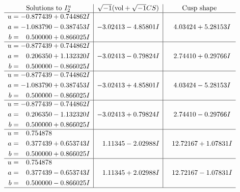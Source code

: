 \documentclass[1p]{elsarticle_modified}
\theoremstyle{definition}
\newcommand{\I}{\sqrt{-1}}
\begin{document}
$$\begin{array}{c|c|c}  
\text{Solutions to }I^u_{2}& \I (\text{vol} + \sqrt{-1}CS) & \text{Cusp shape}\\
 \hline 
\begin{aligned}
u &= -0.877439 + 0.744862 I \\
a &= -1.083790 - 0.387453 I \\
b &= \phantom{-}0.500000 + 0.866025 I\end{aligned}
 & -3.02413 - 4.85801 I & \phantom{-}4.03424 + 5.28153 I \\ \hline\begin{aligned}
u &= -0.877439 + 0.744862 I \\
a &= \phantom{-}0.206350 + 1.132320 I \\
b &= \phantom{-}0.500000 - 0.866025 I\end{aligned}
 & -3.02413 - 0.79824 I & \phantom{-}2.74410 + 0.29766 I \\ \hline\begin{aligned}
u &= -0.877439 - 0.744862 I \\
a &= -1.083790 + 0.387453 I \\
b &= \phantom{-}0.500000 - 0.866025 I\end{aligned}
 & -3.02413 + 4.85801 I & \phantom{-}4.03424 - 5.28153 I \\ \hline\begin{aligned}
u &= -0.877439 - 0.744862 I \\
a &= \phantom{-}0.206350 - 1.132320 I \\
b &= \phantom{-}0.500000 + 0.866025 I\end{aligned}
 & -3.02413 + 0.79824 I & \phantom{-}2.74410 - 0.29766 I \\ \hline\begin{aligned}
u &= \phantom{-}0.754878\phantom{ +0.000000I} \\
a &= \phantom{-}0.377439 + 0.653743 I \\
b &= \phantom{-}0.500000 + 0.866025 I\end{aligned}
 & \phantom{-}1.11345 - 2.02988 I & \phantom{-}12.72167 + 1.07831 I \\ \hline\begin{aligned}
u &= \phantom{-}0.754878\phantom{ +0.000000I} \\
a &= \phantom{-}0.377439 - 0.653743 I \\
b &= \phantom{-}0.500000 - 0.866025 I\end{aligned}
 & \phantom{-}1.11345 + 2.02988 I & \phantom{-}12.72167 - 1.07831 I\\
 \hline 
 \end{array}$$\newpage
\end{document}
